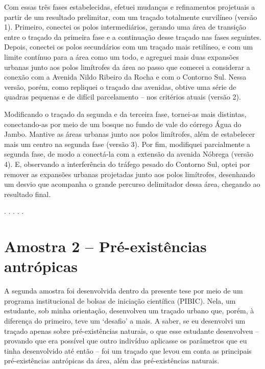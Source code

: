 \documentclass[12pt, a4paper]{book} %
\begin{document}
        Com essas três fases estabelecidas, efetuei mudanças e refinamentos projetuais a partir de um resultado prelimitar, com um traçado totalmente curvilíneo (versão 1). Primeiro, conectei os polos intermediários, gerando uma área de transição entre o traçado da primeira fase e a continuação desse traçado nas fases seguintes. Depois, conectei os polos secundários com um traçado mais retilíneo, e com um limite contínuo para a área como um todo, e agreguei mais duas expansões urbanas junto aos polos limítrofes da área ao passo que comecei a considerar a conexão com a Avenida Nildo Ribeiro da Rocha e com o Contorno Sul. Nessa versão, porém, como repliquei o traçado das avenidas, obtive uma série de quadras pequenas e de difícil parcelamento – nos critérios atuais (versão 2).

        Modificando o traçado da segunda e da terceira fase, tornei-as mais distintas, conectando-as por meio de um bosque no fundo de vale do córrego Água do Jambo. Mantive as áreas urbanas junto aos polos limítrofes, além de estabelecer mais um centro na segunda fase (versão 3). Por fim, modifiquei parcialmente a segunda fase, de modo a conectá-la com a extensão da avenida Nóbrega (versão 4). E, observando a interferência do tráfego pesado do Contorno Sul, optei por remover as expansões urbanas projetadas junto aos polos limítrofes, desenhando um desvio que acompanha o grande percurso delimitador dessa área, chegando ao resultado final.

        \begin{center}
            . . . . .
        \end{center} 


            \section{Amostra 2 – Pré-existências antrópicas}
        A segunda amostra foi desenvolvida dentro da presente tese por meio de um programa institucional de bolsas de iniciação científica (PIBIC). Nela, um estudante, sob minha orientação, desenvolveu um traçado urbano que, porém, à diferença do primeiro, teve um `desafio' a mais. A saber, se eu desenvolvi um traçado apenas sobre pré-existências naturais, o que esse estudante desenvolveu – provando que era possível que outro indivíduo aplicasse os parâmetros que eu tinha desenvolvido até então – foi um traçado que levou em conta as principais pré-existências antrópicas da área, além das pré-existências naturais.
\end{document}
